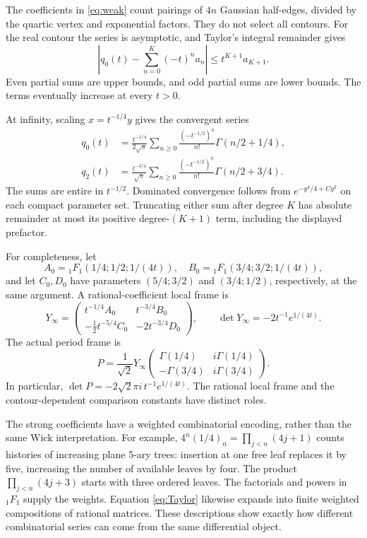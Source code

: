 \documentclass[11pt]{article}
\theoremstyle{definition}
\numberwithin{equation}{section}
\begin{document}
The coefficients in \eqref{eq:weak} count pairings of $4n$ Gaussian
half-edges, divided by the quartic vertex and exponential factors.
They do not select all contours. For the real contour the series is
asymptotic, and Taylor's integral remainder gives
\begin{equation}\label{eq:weakbound}
 \left|q_0(t)-\sum_{n=0}^K(-t)^n a_n\right|
 \le t^{K+1}a_{K+1}.
\end{equation}
Even partial sums are upper bounds, and odd partial sums are lower bounds.
The terms eventually increase at every $t>0$.

At infinity, scaling $x=t^{-1/4}y$ gives the convergent series
\begin{align}\label{eq:strong}
 q_0(t)&=\frac{t^{-1/4}}{2\sqrt\pi}
 \sum_{n\ge0}\frac{(-t^{-1/2})^n}{n!}\Gamma(n/2+1/4),\\
 q_2(t)&=\frac{t^{-3/4}}{\sqrt\pi}
 \sum_{n\ge0}\frac{(-t^{-1/2})^n}{n!}\Gamma(n/2+3/4).
 \nonumber
\end{align}
The sums are entire in $t^{-1/2}$. Dominated convergence follows from
$e^{-y^4/4+C y^2}$ on each compact parameter set. Truncating either
sum after degree $K$ has absolute remainder at most its positive
degree-$(K+1)$ term, including the displayed prefactor.

For completeness, let
\[
 A_0={}_1F_1(1/4;1/2;1/(4t)),\quad
 B_0={}_1F_1(3/4;3/2;1/(4t)),
\]
and let $C_0,D_0$ have parameters $(5/4;3/2)$ and $(3/4;1/2)$,
respectively, at the same argument. A rational-coefficient local frame is
\begin{equation}\label{eq:infinityframe}
 Y_\infty=\begin{pmatrix}
 t^{-1/4}A_0&t^{-3/4}B_0\\
 -\tfrac12t^{-5/4}C_0&-2t^{-3/4}D_0
 \end{pmatrix},\qquad
 \det Y_\infty=-2t^{-1}e^{1/(4t)}.
\end{equation}
The actual period frame is
\begin{equation}\label{eq:comparison}
 P=\frac1{\sqrt2}Y_\infty
 \begin{pmatrix}\Gamma(1/4)&i\Gamma(1/4)\\
 -\Gamma(3/4)&i\Gamma(3/4)\end{pmatrix}.
\end{equation}
In particular, $\det P=-2\sqrt2\pi i\,t^{-1}e^{1/(4t)}$.
The rational local frame and the contour-dependent comparison constants
have distinct roles.

The strong coefficients have a weighted combinatorial encoding, rather
than the same Wick interpretation. For example,
$4^n(1/4)_n=\prod_{j<n}(4j+1)$ counts histories of increasing plane
5-ary trees: insertion at one free leaf replaces it by five, increasing
the number of available leaves by four. The product
$\prod_{j<n}(4j+3)$ starts with three ordered leaves. The factorials and
powers in ${}_1F_1$ supply the weights. Equation \eqref{eq:Taylor}
likewise expands into finite weighted compositions of rational matrices.
These descriptions show exactly how different combinatorial series can
come from the same differential object.
\end{document}

